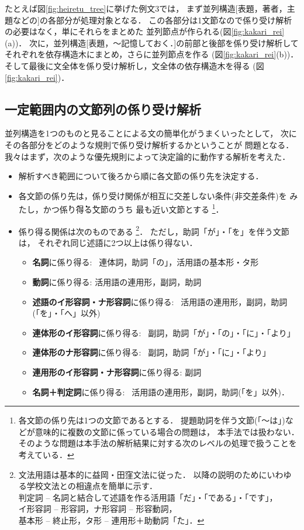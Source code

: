 たとえば図\ref{fig:heiretu_tree}に挙げた例文3では，
まず並列構造[表題，著者，主題などの]の各部分が処理対象となる．
この各部分は1文節なので係り受け解析の必要はなく，単にそれらをまとめた
並列節点が作られる(図\ref{fig:kakari_rei}(a))．
次に，並列構造[表題，〜記憶しておく．]の前部と後部を係り受け解析して
それぞれを依存構造木にまとめ，さらに並列節点を作る
(図\ref{fig:kakari_rei}(b))．
そして最後に文全体を係り受け解析し，文全体の依存構造木を得る
(図\ref{fig:kakari_rei})．

\subsection{一定範囲内の文節列の係り受け解析}

並列構造を1つのものと見ることによる文の簡単化がうまくいったとして，
次にその各部分をどのような規則で係り受け解析するかということが
問題となる．
我々はまず，次のような優先規則によって決定論的に動作する解析を考えた．
\begin{itemize}
  \item 解析すべき範囲について後ろから順に各文節の係り先を決定する．
  \item 各文節の係り先は，係り受け関係が相互に交差しない条件(非交差条件)を
みたし，かつ\.{係}\.{り}\.{得}\.{る}文節のうち
最も近い文節とする\cite{Maruyama1992}
\footnote{
各文節の係り先は1つの文節であるとする．
提題助詞を伴う文節(「〜は」)などが意味的に複数の文節に係っている場合の問題は，
本手法では扱わない．
そのような問題は本手法の解析結果に対する次のレベルの処理で扱うことを
考えている．
}．
  \item 係り得る関係は次のものである
\footnote{
文法用語は基本的に益岡・田窪文法\cite{Masuoka1989}に従った．
以降の説明のためにいわゆる学校文法との相違点を簡単に示す． \\
判定詞 -- 名詞と結合して述語を作る活用語「だ」・「である」・「です」， \\
イ形容詞 -- 形容詞，ナ形容詞 -- 形容動詞， \\
基本形 -- 終止形，タ形 -- 連用形＋助動詞「た」．
}．
ただし，助詞「が」・「を」を伴う文節は，
それぞれ同じ述語に2つ以上は係り得ない．
\begin{itemize}
  \item 
{\bf 名詞}に係り得る: 
\ 連体詞，助詞「の」，活用語の基本形・タ形
  \item 
{\bf 動詞}に係り得る: 活用語の連用形，副詞，助詞
  \item 
{\bf 述語のイ形容詞・ナ形容詞}に係り得る: 
\ 活用語の連用形，副詞，助詞(「を」・「へ」以外)
  \item 
{\bf 連体形のイ形容詞}に係り得る: 
\ 副詞，助詞「が」・「の」・「に」・「より」
  \item 
{\bf 連体形のナ形容詞}に係り得る: 
\ 副詞，助詞「が」・「に」・「より」
  \item 
{\bf 連用形のイ形容詞・ナ形容詞}に係り得る: 副詞
  \item 
{\bf 名詞＋判定詞}に係り得る: 
\ 活用語の連用形，副詞，助詞(「を」以外)．
\end{itemize}
\end{itemize}
